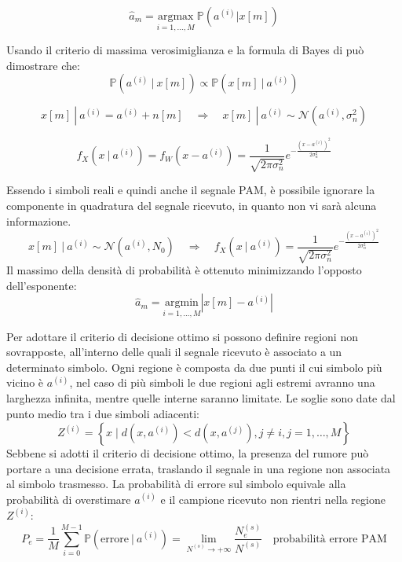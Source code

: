 \[
    \hat{a}_m = \underset{i=1,\ldots,M}{\mathrm{argmax}} \ \mathbb{P}(a^{(i)}|x[m])
\]

Usando il criterio di massima verosimiglianza e la formula di Bayes di può dimostrare che:
\[
    \mathbb{P}(a^{(i)} \ | \ x[m]) \propto  \mathbb{P}(x[m] \ | \ a^{(i)})
\]

\[
    x[m] \ | \ a^{(i)}  = a^{(i)} + n[m] \quad \Rightarrow \quad x[m] \ | \ a^{(i)} \sim \mathcal{N}(a^{(i)}, \sigma_n^2)
\]

\[
    f_X(x \ | \ a^{(i)}) = f_{W}(x - a^{(i)}) = \frac{1}{\sqrt{2\pi \sigma_n^2}} e^{-\frac{(x - a^{(i)})^2}{2\sigma_n^2}}
\]


Essendo i simboli reali e quindi anche il segnale PAM, è possibile ignorare la componente in quadratura del segnale ricevuto, in quanto non vi sarà alcuna informazione.
\[
    x[m] \ | \ a^{(i)} \sim \mathcal{N}(a^{(i)}, N_0) \quad \Rightarrow \quad f_X(x \ | \ a^{(i)}) = \frac{1}{\sqrt{2\pi \sigma_n^2}} e^{-\frac{(x - a^{(i)})^2}{2\sigma_n^2}}
\]
Il massimo della densità di probabilità è ottenuto minimizzando l'opposto dell'esponente:
\[
    \hat{a}_m = \underset{i=1,\ldots,M}{\mathrm{argmin}} \left| x[m] - a^{(i)} \right| 
\]

Per adottare il criterio di decisione ottimo si possono definire regioni non sovrapposte, all'interno delle quali il segnale ricevuto è associato a un determinato simbolo.
Ogni regione è composta da due punti il cui simbolo più vicino è $a^{(i)}$, nel caso di più simboli le due regioni agli estremi avranno una larghezza infinita, mentre quelle interne saranno limitate.
Le soglie sono date dal punto medio tra i due simboli adiacenti:
\[
    Z^{(i)} = \left\{ x \mid d(x, a^{(i)}) < d(x, a^{(j)}), j \neq i, j = 1, \ldots, M \right\}
\]
Sebbene si adotti il criterio di decisione ottimo, la presenza del rumore può portare a una decisione errata, traslando il segnale in una regione non associata al simbolo trasmesso.
La probabilità di errore sul simbolo equivale alla probabilità di overstimare $a^{(i)}$ e il campione ricevuto non rientri nella regione $Z^{(i)}$:
\[
    P_e = \frac{1}{M} \sum_{i=0}^{M-1} \mathbb{P}(\text{errore} \ | \ a^{(i)}) = \lim_{N^{(s)} \to +\infty} \frac{N_e^{(s)}}{N^{(s)}} \quad \text{probabilità errore PAM}
\]





























